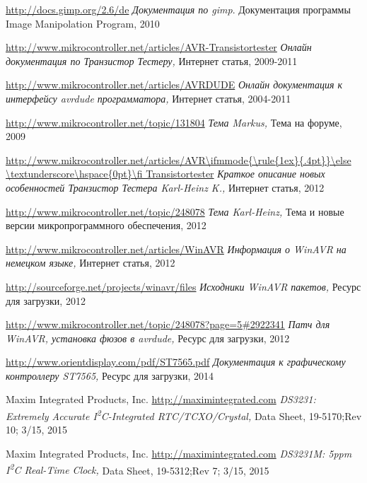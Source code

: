 \documentclass[12pt,a4paper,oneside,english]{report}
\DeclareRobustCommand{\_}{\ifmmode{\rule{1ex}{.4pt}}\else \textunderscore\hspace{0pt}\fi}
\begin{document}
\begin{thebibliography}{99}
\url{http://docs.gimp.org/2.6/de}
\emph{Документация по gimp}.
Документация программы Image Manipolation Program,
2010

\url{http://www.mikrocontroller.net/articles/AVR-Transistortester}
\emph{Онлайн документация по Транзистор Тестеру,}
Интернет статья,
2009-2011

\url{http://www.mikrocontroller.net/articles/AVRDUDE}
\emph{Онлайн документация к интерфейсу avrdude программатора,}
Интернет статья,
2004-2011

\url{http://www.mikrocontroller.net/topic/131804}
\emph{Тема Markus,}
Тема на форуме, 
2009

\url{http://www.mikrocontroller.net/articles/AVR\_Transistortester}
\emph{Краткое описание новых особенностей Транзистор Тестера Karl-Heinz K.,}
Интернет статья,
2012

\url{http://www.mikrocontroller.net/topic/248078}
\emph{Тема Karl-Heinz,}
Тема и новые версии микропрограммного обеспечения,
2012

\url{http://www.mikrocontroller.net/articles/WinAVR}
\emph{Информация о WinAVR на немецком языке,}
Интернет статья,
2012

\url{http://sourceforge.net/projects/winavr/files}
\emph{Исходники WinAVR пакетов,}
Ресурс для загрузки,
2012

\url{http://www.mikrocontroller.net/topic/248078?page=5#2922341}
\emph{Патч для WinAVR, установка фюзов в avrdude,}
Ресурс для загрузки,
2012

\url{http://www.orientdisplay.com/pdf/ST7565.pdf}
\emph{Документация к графическому контроллеру ST7565,}
Ресурс для загрузки,
2014

Maxim Integrated Products, Inc.
\url{http://maximintegrated.com}
\emph{DS3231: Extremely Accurate I\textsuperscript{2}C-Integrated RTC/TCXO/Crystal,}
Data Sheet,
19-5170;Rev 10; 3/15,
2015

Maxim Integrated Products, Inc.
\url{http://maximintegrated.com}
\emph{DS3231M: 5ppm I\textsuperscript{2}C Real-Time Clock,}
Data Sheet,
19-5312;Rev 7; 3/15,
2015


\end{thebibliography}
\end{document}
